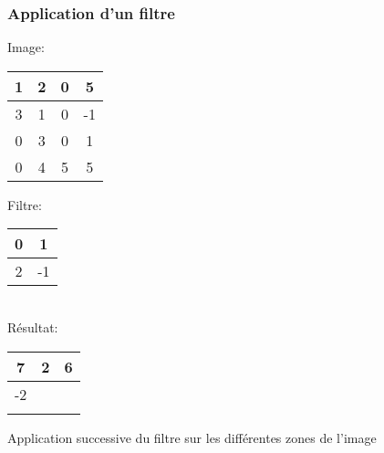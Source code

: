 \documentclass{formation}
\begin{document}
\begin{frame}
  \frametitle{Application d'un filtre}
  \begin{multicols}{2}
    Image:
    \begin{tabular}{|c|c|c|c|}
      \hline
      1 & 2 & 0 & 5 \\
      \hline
      \cellcolor{green}3 & \cellcolor{green}1 & 0 & -1 \\
      \hline
      \cellcolor{green}0 & \cellcolor{green}3 & 0 & 1 \\
      \hline
      0 & 4 & 5 & 5 \\
      \hline
    \end{tabular}

    \columnbreak

    Filtre:
    \begin{tabular}{|c|c|}
      \hline
      0 & 1  \\
      \hline
      2 & -1 \\
      \hline
    \end{tabular}\\[.5cm]
    Résultat:
    \begin{tabular}{|c|c|c|}
      \hline
      7 & 2 & 6\\
      \hline
      -2 &  & \phantom{-2}\\
      \hline
        &  & \\
      \hline
    \end{tabular}
  \end{multicols}
  Application successive du filtre sur les différentes zones de l'image
\end{frame}
\end{document}
